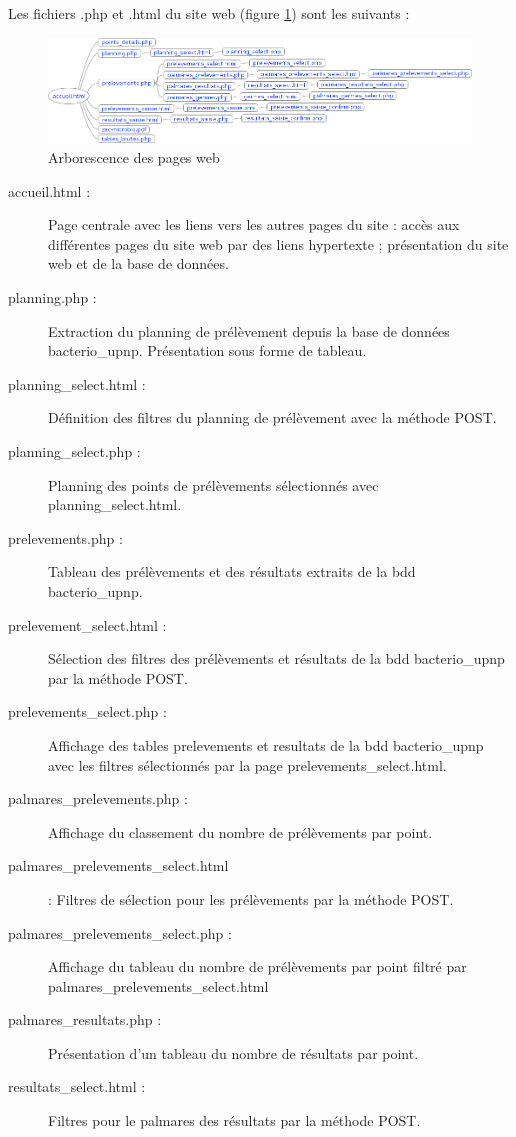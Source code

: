 \documentclass[12pt,a4paper,oneside]{article}
\begin{document}
Les fichiers .php et .html du site web (figure \ref{arbo}) sont les suivants :
\begin{figure}[h]
\caption{\label{arbo}Arborescence des pages web}
\includegraphics[scale=0.45]{arborescence.png}
\end{figure}
\begin{description}
\item[accueil.html :] Page centrale avec les liens vers les autres pages du site : accès aux différentes pages du site web par des liens hypertexte ; présentation du site web et de la base de données.
\item[planning.php :] Extraction du planning de prélèvement depuis la base de données bacterio\_upnp. Présentation sous forme de tableau.
\item[planning\_select.html :] Définition des filtres du planning de prélèvement avec la méthode POST.
\item[planning\_select.php :] Planning des points de prélèvements sélectionnés avec planning\_select.html.
\item[prelevements.php :] Tableau des prélèvements et des résultats extraits de la bdd bacterio\_upnp.
\item[prelevement\_select.html :] Sélection des filtres des prélèvements et résultats de la bdd bacterio\_upnp par la méthode POST.
\item[prelevements\_select.php :] Affichage des tables prelevements et resultats de la bdd bacterio\_upnp avec les filtres sélectionnés par la page prelevements\_select.html.
\item[palmares\_prelevements.php :] Affichage du classement du nombre de prélèvements par point.
\item[palmares\_prelevements\_select.html] : Filtres de sélection pour les prélèvements par la méthode POST.
\item[palmares\_prelevements\_select.php :] Affichage du tableau du nombre de prélèvements par point filtré par palmares\_prelevements\_select.html
\item[palmares\_resultats.php :] Présentation d'un tableau du nombre de résultats par point.
\item[resultats\_select.html :] Filtres pour le palmares des résultats par la méthode POST.

\end{description}
\end{document}

